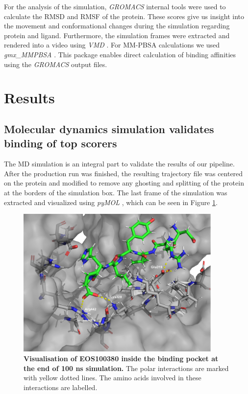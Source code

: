 \documentclass[11pt, letterpaper, titlepage]{article}
\renewcommand{\cite}{\parencite}
\begin{document}
For the analysis of the simulation, \textit{GROMACS} internal tools were used to calculate the RMSD and RMSF of the protein. These scores give us insight into the movement and conformational changes during the simulation regarding protein and ligand. Furthermore, the simulation frames were extracted and rendered into a video using \textit{VMD} \cite{VMD}. For MM-PBSA calculations we used \textit{gmx\_MMPBSA} \cite{MMPBSA1}. This package enables direct calculation of binding affinities using the \textit{GROMACS} output files.
\section{Results} 
\subsection{Molecular dynamics simulation validates binding of top scorers}
The \ac{MD} simulation is an integral part to validate the results of our pipeline. After the production run was finished, the resulting trajectory file was centered on the protein and modified to remove any ghosting and splitting of the protein at the borders of the simulation box. The last frame of the simulation was extracted and visualized using \textit{pyMOL} \cite{PyMOL}, which can be seen in Figure \ref{MD.Annotated}. 
\begin{figure}[h]
  \begin{center}
    \includegraphics[width=0.9\textwidth]{last_frame_render_annotated.pdf}
  \end{center}
  \caption{\textbf{Visualisation of EOS100380 inside the binding pocket at the end of 100 ns simulation.} The polar interactions are marked with yellow dotted lines. The amino acids involved in these interactions are labelled.}\label{MD.Annotated}
\end{figure}
\end{document}
